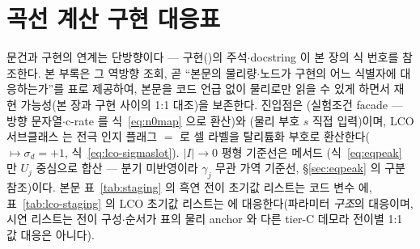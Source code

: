 \section{곡선 계산 구현 대응표}\label{sec:appendix-code}
문건과 구현의 연계는 단방향이다 --- 구현()의 주석$\cdot$docstring 이 본 장의 식 번호를 참조한다. 본 부록은 그 역방향 조회, 곧 ``본문의 물리량$\cdot$노드가 구현의 어느 식별자에
대응하는가''를 표로 제공하여, 본문을 코드 언급 없이 물리로만 읽을 수 있게 하면서 재현 가능성(본 장과
구현 사이의 1:1 대조)을 보존한다. 진입점은 (실험조건 facade --- 방향 문자열$\cdot$c-rate 를
식~\eqref{eq:n0map} 으로 환산)와 (물리 부호 $s$ 직접 입력)이며, LCO 서브클래스
 는 전극 인지 플래그 $=$ 로 셀 라벨을
탈리튬화 부호로 환산한다($\mapsto\sigma_d{=}+1$, 식~\eqref{eq:lco-sigmaslot}). $|I|\to0$
평형 기준선은 메서드 (식~\eqref{eq:eqpeak} 만 $U_j$ 중심으로 합산 --- 분기
미반영이라 $\gamma_j$ 무관 가역 기준선, \S\ref{sec:eqpeak} 의 구분 참조)이다. 본문 표~\ref{tab:staging} 의
흑연 전이 초기값 리스트는 코드 변수  에, 표~\ref{tab:lco-staging} 의 LCO
초기값 리스트는  에 대응한다(파라미터 \emph{구조}의 대응이며, 
시연 리스트는 전이 구성$\cdot$순서가 표의 물리 anchor 와 다른 tier-C 데모라 전이별 1:1 값 대응은 아니다).

